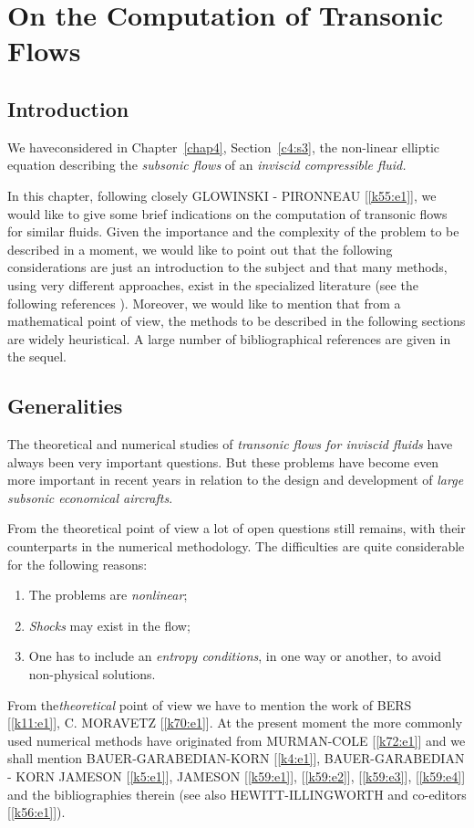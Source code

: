 
\chapter{On the Computation of Transonic Flows}\label{chap6}%
 
\section{Introduction}\label{c6:s1}%
We have\pageoriginale considered in Chapter~\ref{chap4},
Section~\ref{c4:s3},  the  
non-linear elliptic equation describing the \textit{subsonic flows} of 
an \textit{inviscid compressible fluid.}   

In this chapter, following closely GLOWINSKI - PIRONNEAU
[\ref{k55:e1}],  we would  
 like to give some brief indications on the  computation of transonic 
 flows for similar fluids.  Given the importance and the complexity of 
 the problem to be described in a moment, we would  like to point out 
 that the following considerations are just an introduction to the 
 subject and that many methods,  using very different approaches,  
 exist in the specialized literature (see the following  references ).  
 Moreover,  we would like to mention that from a mathematical point of 
 view,  the methods to be described in the following sections are 
 widely heuristical.  A large number of bibliographical references are 
 given in the sequel.           

\section{Generalities}\label{c6:s2}

The theoretical and numerical studies of \textit{transonic flows for 
inviscid fluids} have always been very important questions.  But these 
problems have become even more important in recent years in relation to 
the design and development of \textit{large subsonic economical 
aircrafts}.    

From the theoretical point of view a lot of open questions still 
remains, with their counterparts in the numerical methodology. The  
difficulties are quite considerable for the following reasons:   
\begin{enumerate}[(1)]
\item The problems are \textit{nonlinear};
\item \textit{Shocks} may exist in the flow;
\item One has to include an \textit{entropy conditions}, in one way or 
another, to avoid non-physical solutions.  
\end{enumerate}
From the\pageoriginale \textit{theoretical} point of view we have to
mention the work  
of BERS [\ref{k11:e1}], C. MORAVETZ [\ref{k70:e1}]. At  the present
moment the more commonly  
used  numerical methods have originated from MURMAN-COLE
[\ref{k72:e1}] and we  
shall mention BAUER-GARABEDIAN-KORN [\ref{k4:e1}],  BAUER-GARABEDIAN - KORN 
JAMESON [\ref{k5:e1}],  JAMESON [\ref{k59:e1}], [\ref{k59:e2}],
[\ref{k59:e3}], [\ref{k59:e4}] and the bibliographies therein  
(see also HEWITT-ILLINGWORTH and co-editors [\ref{k56:e1}]).      

